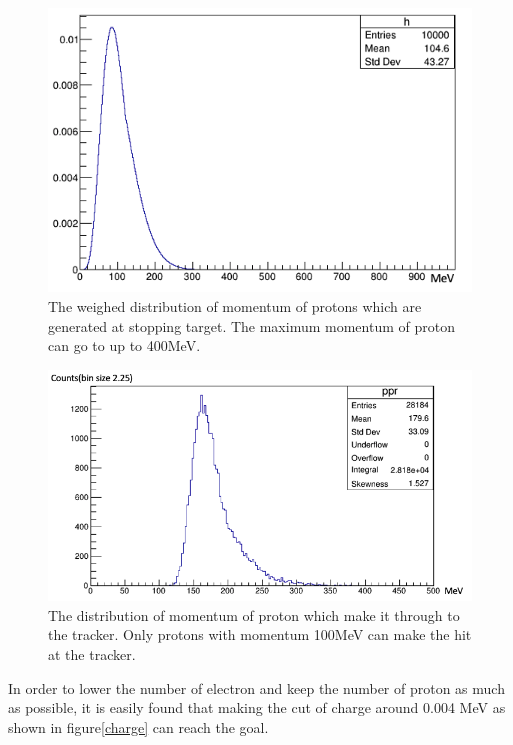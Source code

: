 \documentclass[12pt]{extarticle}
\begin{document}
\begin{figure}[H]
\centering
\includegraphics[width=0.9\linewidth]{figure/Generated_proton_p_distribution.png}
\caption{The weighed distribution of momentum of protons which are generated at stopping target. The maximum momentum of proton can go to up to 400MeV.}
\label{generated_proton_p}
\end{figure}

\begin{figure}[H]
\centering
\includegraphics[width=0.9\linewidth]{figure/reconstructed_proton_momentum.png}
\caption{The distribution of momentum of proton which make it through to the tracker. Only protons with momentum 100MeV can make the hit at the tracker.}
\label{proton_P}
\end{figure}

\noindent In order to lower the number of electron and keep the number of proton as much as possible, it is easily found that making the cut of charge around 0.004 MeV as shown in figure\ref{charge} can reach the goal.
\end{document}
